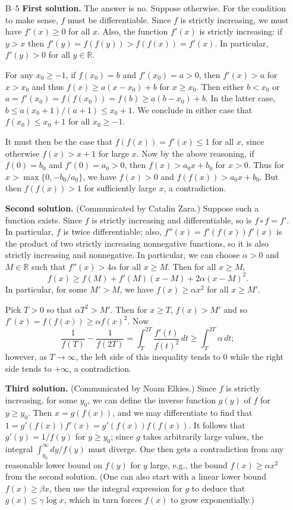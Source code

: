 \documentclass[amssymb,twocolumn,pra,10pt,aps]{revtex4-1}
\newcommand{\RR}{\mathbb{R}}
\begin{document}
\begin{itemize}
\item[B--5]
\textbf{First solution.}
The answer is no. Suppose otherwise. For the condition to make sense, $f$ must be differentiable.
Since $f$ is strictly increasing, we must have $f'(x) \geq 0$ for all $x$.
Also, the function $f'(x)$ is strictly increasing: if $y>x$ then $f'(y) = f(f(y)) > f(f(x)) = f'(x)$.
In particular, $f'(y) > 0$ for all $y \in \RR$.

For any $x_0 \geq -1$, if $f(x_0) = b$ and $f'(x_0) = a > 0$, then $f'(x) > a$ for $x>x_0$ and thus $f(x) \geq a(x-x_0)+b$ for $x\geq x_0$. Then either $b < x_0$ or
$a = f'(x_0) = f(f(x_0)) = f(b) \geq a(b-x_0)+b$. In the latter case,
$b \leq a(x_0+1)/(a+1) \leq x_0+1$. We conclude in either case that $f(x_0) \leq x_0+1$ for all $x_0 \geq -1$.

It must then be the case that $f(f(x)) = f'(x) \leq 1$ for all $x$, since otherwise $f(x) > x+1$ for large $x$. Now by the above reasoning, if $f(0) = b_0$ and $f'(0) = a_0>0$, then $f(x) > a_0x+b_0$ for $x>0$. Thus for $x > \max\{0,-b_0/a_0\}$, we have
$f(x) > 0$ and $f(f(x)) > a_0x+b_0$. But then $f(f(x)) > 1$ for sufficiently large $x$, a contradiction.

\textbf{Second solution.}
(Communicated by Catalin Zara.)
Suppose such a function exists. Since $f$ is strictly increasing and differentiable, so is $f \circ f = f'$.
In particular, $f$ is twice differentiable; also, $f''(x) = f'(f(x)) f'(x)$ is the product of two strictly
increasing nonnegative functions, so it is also strictly increasing and nonnegative. In particular, we can choose
$\alpha>0$ and $M \in \RR$ such that $f''(x) > 4\alpha$ for all $x \geq M$. Then for all $x \geq M$,
\[
f(x) \geq f(M) + f'(M)(x-M) + 2\alpha (x-M)^2.
\]
In particular, for some $M' > M$, we have $f(x) \geq \alpha x^2$ for all $x \geq M'$.

Pick $T>0$ so that $\alpha T^2 > M'$. Then for $x \geq T$,
$f(x) > M'$ and so $f'(x) = f(f(x)) \geq \alpha f(x)^2$.
Now
\[
\frac{1}{f(T)} - \frac{1}{f(2T)}
= \int_T^{2T} \frac{f'(t)}{f(t)^2}\,dt \geq \int_T^{2T} \alpha\,dt;
\]
however, as $T \to \infty$, the left side of this inequality
tends to 0 while the right side tends to $+\infty$,
a contradiction.

\textbf{Third solution.}
(Communicated by Noam Elkies.)
Since $f$ is strictly increasing, for some $y_0$, we can define the inverse function
$g(y)$ of $f$ for $y \geq y_0$. Then $x = g(f(x))$, and we may differentiate to find that
$1 = g'(f(x)) f'(x) = g'(f(x)) f(f(x))$. It follows that $g'(y) = 1/f(y)$ for $y \geq y_0$;
since $g$ takes arbitrarily large values, the integral $\int_{y_0}^\infty dy/f(y)$ must diverge.
One then gets a contradiction from any reasonable lower bound on $f(y)$ for $y$ large,
e.g., the bound $f(x) \geq \alpha x^2$ from the second solution. (One can also
start with a linear lower bound $f(x) \geq \beta x$, then use the integral expression for $g$
to deduce that $g(x) \leq \gamma \log x$, which in turn forces $f(x)$ to grow exponentially.)


\end{itemize}
\end{document}
